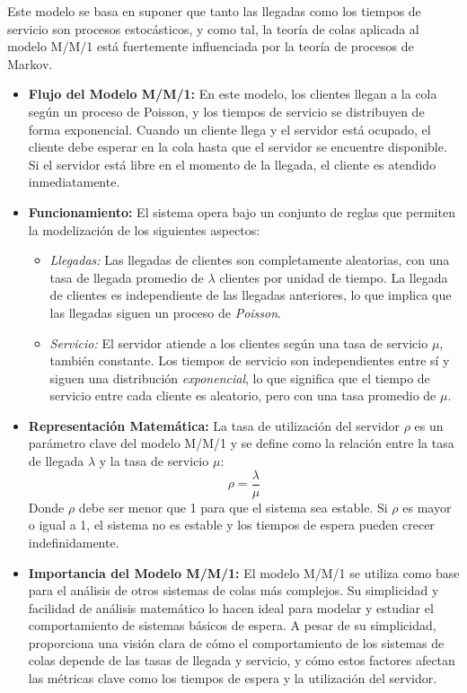 \documentclass{article}
\begin{document}
Este modelo se basa en suponer que tanto las llegadas como los tiempos de servicio son procesos estocásticos, y como tal, la teoría de colas aplicada al modelo M/M/1 está fuertemente influenciada por la teoría de procesos de Markov.

\begin{itemize}
    \item \textbf{Flujo del Modelo M/M/1:} En este modelo, los clientes llegan a la cola según un proceso de Poisson, y los tiempos de servicio se distribuyen de forma exponencial. Cuando un cliente llega y el servidor está ocupado, el cliente debe esperar en la cola hasta que el servidor se encuentre disponible. Si el servidor está libre en el momento de la llegada, el cliente es atendido inmediatamente.
    
    \item \textbf{Funcionamiento:} El sistema opera bajo un conjunto de reglas que permiten la modelización de los siguientes aspectos:
    \begin{itemize}
        \item \textit{Llegadas:} Las llegadas de clientes son completamente aleatorias, con una tasa de llegada promedio de \( \lambda \) clientes por unidad de tiempo. La llegada de clientes es independiente de las llegadas anteriores, lo que implica que las llegadas siguen un proceso de \textit{Poisson}.
        
        \item \textit{Servicio:} El servidor atiende a los clientes según una tasa de servicio \( \mu \), también constante. Los tiempos de servicio son independientes entre sí y siguen una distribución \textit{exponencial}, lo que significa que el tiempo de servicio entre cada cliente es aleatorio, pero con una tasa promedio de \( \mu \).
    \end{itemize}
    
    \item \textbf{Representación Matemática:} La tasa de utilización del servidor \( \rho \) es un parámetro clave del modelo M/M/1 y se define como la relación entre la tasa de llegada \( \lambda \) y la tasa de servicio \( \mu \):
    \[
    \rho = \frac{\lambda}{\mu}
    \]
    Donde \( \rho \) debe ser menor que 1 para que el sistema sea estable. Si \( \rho \) es mayor o igual a 1, el sistema no es estable y los tiempos de espera pueden crecer indefinidamente.
    
    \item \textbf{Importancia del Modelo M/M/1:} El modelo M/M/1 se utiliza como base para el análisis de otros sistemas de colas más complejos. Su simplicidad y facilidad de análisis matemático lo hacen ideal para modelar y estudiar el comportamiento de sistemas básicos de espera. A pesar de su simplicidad, proporciona una visión clara de cómo el comportamiento de los sistemas de colas depende de las tasas de llegada y servicio, y cómo estos factores afectan las métricas clave como los tiempos de espera y la utilización del servidor.
    

\end{itemize}
\end{document}
